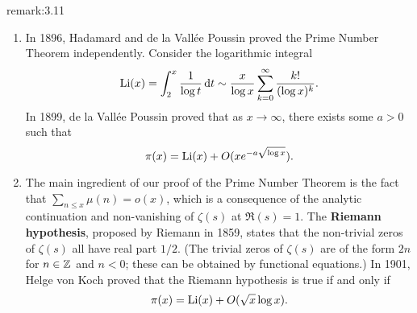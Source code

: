 \begin{remark}{remark:3.11}
    \begin{enumerate}[(1)]
        \item In 1896, Hadamard and de la Vall\'ee Poussin proved the Prime 
        Number Theorem independently. Consider the logarithmic integral 
        \[ \operatorname{Li}(x) = \int_2^x \frac{1}{\log t}\,\mathrm{d} t \sim \frac{x}{\log x} 
        \sum_{k=0}^\infty \frac{k!}{(\log x)^k}. \] 
        In 1899, de la Vall\'ee Poussin proved that as $x \to \infty$, there 
        exists some $a > 0$ such that 
        \[ \pi(x) = \operatorname{Li}(x) + O(xe^{-a\sqrt{\log x}}). \]
        \item The main ingredient of our proof of the Prime Number Theorem is the 
        fact that $\sum_{n\leq x} \mu(n) = o(x)$, which is a consequence of the 
        analytic continuation and non-vanishing of $\zeta(s)$ at $\Re(s) = 1$. 
        The {\bf Riemann hypothesis}, proposed by Riemann in 1859, states that 
        the non-trivial zeros of $\zeta(s)$ all have real part $1/2$. 
        (The trivial zeros of $\zeta(s)$ are of the form $2n$ for $n \in \mathbb{Z}$ and 
        $n < 0$; these can be obtained by functional equations.) In 1901, Helge von 
        Koch proved that the Riemann hypothesis is true if and only if 
        \[ \pi(x) = \operatorname{Li}(x) + O(\sqrt x \log x). \] 
    \end{enumerate}
\end{remark}
